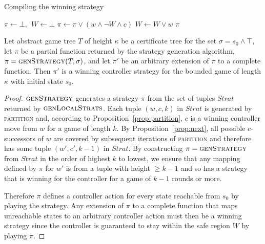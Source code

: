 \begin{algorithm}
   \caption{Compiling the  winning strategy}\label{alg:compile}
   \begin{algorithmic}[1]
            \State $\pi \gets \bot,~~W \gets \bot$
                \State $\pi \gets \pi \lor (w \land \neg W \land c)$
                    \State $W \gets W \lor w$
                \EndFor
            \EndFor
            \State \Return $\pi$
        \EndFunction
    \end{algorithmic}
\end{algorithm}

\begin{theorem}\label{th:stratCorrectness}
Let abstract game tree $T$ of height $\kappa$ be a certificate tree for the set $\sigma = s_0 \land \top$, let $\pi$ be a partial function returned by the strategy generation algorithm, $\pi=\textsc{genStrategy}(T,\sigma)$, and let $\pi'$ be an arbitrary extension of $\pi$ to a complete function.  Then $\pi'$ is a winning controller strategy for the bounded game of length $\kappa$ with initial state $s_0$.
\end{theorem}
\begin{proof}
    $\textsc{genStrategy}$ generates a strategy $\pi$ from the set of tuples $Strat$ returned by $\textsc{genLocalStrats}$. Each tuple $(w, c, k)$ in $Strat$ is generated by \textsc{partition} and, according to Proposition~\ref{prop:partition}, $c$ is a winning controller move from $w$ for a game of length $k$. By Proposition~\ref{prop:next}, all possible $c$-successors of $w$ are covered by subsequent iterations of \textsc{partition} and therefore has some tuple $(w', c', k-1)$ in $Strat$. By constructing $\pi = \textsc{genStrategy}$ from $Strat$ in the order of highest $k$ to lowest, we ensure that any mapping defined by $\pi$ for $w'$ is from a tuple with height $\geq k-1$ and so has a strategy that is winning for the controller for a game of $k-1$ rounds or more.  
    
    Therefore $\pi$ defines a controller action for every state reachable from $s_0$ by playing the strategy. Any extension of $\pi$ to a complete function that maps unreachable states to an arbitrary controller action must then be a winning strategy since the controller is guaranteed to stay within the safe region $W$ by playing $\pi$.
\end{proof}


